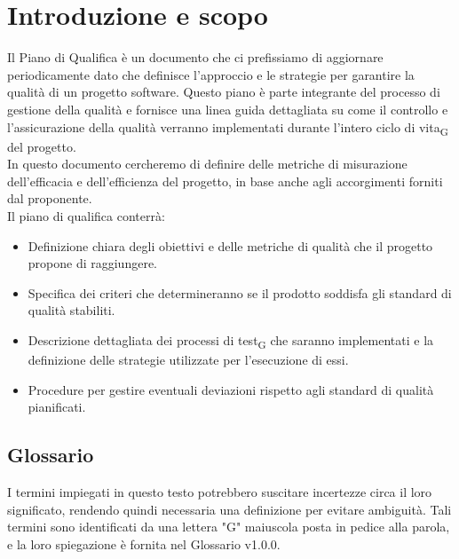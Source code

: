 \documentclass{article}
\begin{document}
{\newpage
\section{Introduzione e scopo}
Il Piano di Qualifica è un documento che ci prefissiamo di aggiornare periodicamente dato che definisce l'approccio e le strategie per garantire la qualità di un progetto software. Questo piano è parte integrante del processo di gestione della qualità e fornisce una linea guida dettagliata su come il controllo e l'assicurazione della qualità verranno implementati durante l'intero ciclo di vita\textsubscript{G} del progetto.\\
In questo documento cercheremo di definire delle metriche di misurazione dell'efficacia e dell'efficienza del progetto, in base anche agli accorgimenti forniti dal proponente.\\

Il piano di qualifica conterrà:

\begin{itemize}
    \item Definizione chiara degli obiettivi e delle metriche di qualità che il progetto propone di raggiungere.
        
    \item Specifica dei criteri che determineranno se il prodotto soddisfa gli standard di qualità stabiliti.
    
    \item Descrizione dettagliata dei processi di test\textsubscript{G} che saranno implementati e la definizione delle strategie utilizzate per l'esecuzione di essi.

    \item Procedure per gestire eventuali deviazioni rispetto agli standard di qualità pianificati.

\end{itemize}

\subsection{Glossario}
I termini impiegati in questo testo potrebbero suscitare incertezze circa il loro significato, rendendo quindi necessaria una definizione per evitare ambiguità. Tali termini sono identificati da una lettera "G" maiuscola posta in pedice alla parola, e la loro spiegazione è fornita nel Glossario v1.0.0.

}
\end{document}
